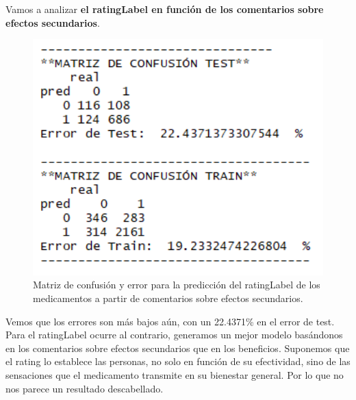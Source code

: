 \documentclass[spanish,]{article}
\newenvironment{Shaded}{\begin{snugshade}}{\end{snugshade}}
\newcommand{\KeywordTok}[1]{\textcolor[rgb]{0.13,0.29,0.53}{\textbf{#1}}}
\newcommand{\OperatorTok}[1]{\textcolor[rgb]{0.81,0.36,0.00}{\textbf{#1}}}
\newcommand{\NormalTok}[1]{#1}
\begin{document}
Vamos a analizar \textbf{el ratingLabel en función de los comentarios
sobre efectos secundarios}.

\begin{Shaded}
\end{Shaded}

\begin{figure}[h]
    \centering
    \includegraphics[width=1\textwidth]{figuras/Bayes/effects_ratingLabel.png}
    \caption{Matriz de confusión y error para la predicción del ratingLabel de los medicamentos a partir de comentarios sobre efectos secundarios.}
    \label{fig:bayes:figura4}
\end{figure}

Vemos que los errores son más bajos aún, con un 22.4371\% en el error de
test. Para el ratingLabel ocurre al contrario, generamos un mejor modelo
basándonos en los comentarios sobre efectos secundarios que en los
beneficios. Suponemos que el rating lo establece las personas, no solo
en función de su efectividad, sino de las sensaciones que el medicamento
transmite en su bienestar general. Por lo que no nos parece un resultado
descabellado.
\end{document}
